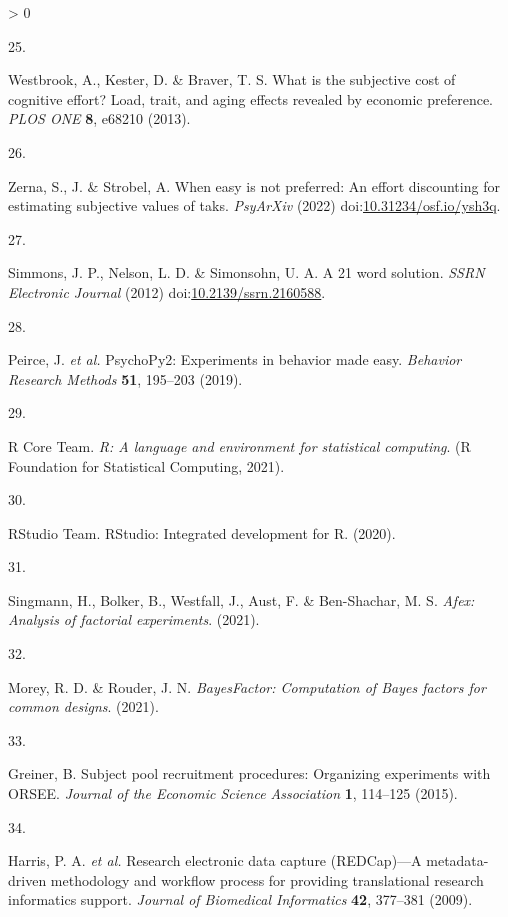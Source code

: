 \documentclass[
  english,
  man,floatsintext]{apa6}
\newlength{\cslhangindent}
\newlength{\csllabelwidth}
\newenvironment{CSLReferences}[2] %
 {%
  \setlength{\parindent}{0pt}
  \ifodd #1 \everypar{\setlength{\hangindent}{\cslhangindent}}\ignorespaces\fi
  \ifnum #2 > 0
  \setlength{\parskip}{#2\baselineskip}
  \fi
 }%
 {}
\newcommand{\CSLLeftMargin}[1]{\parbox[t]{\csllabelwidth}{#1}}
\newcommand{\CSLRightInline}[1]{\parbox[t]{\linewidth - \csllabelwidth}{#1}\break}
\begin{document}
\begin{CSLReferences}{0}{0}
\leavevmode\hypertarget{ref-Westbrook2013}{}%
\CSLLeftMargin{25. }
\CSLRightInline{Westbrook, A., Kester, D. \& Braver, T. S. What is the subjective cost of cognitive effort? {Load}, trait, and aging effects revealed by economic preference. \emph{PLOS ONE} \textbf{8}, e68210 (2013).}

\leavevmode\hypertarget{ref-Zerna2022}{}%
\CSLLeftMargin{26. }
\CSLRightInline{Zerna, S., J. \& Strobel, A. When easy is not preferred: An effort discounting for estimating subjective values of taks. \emph{PsyArXiv} (2022) doi:\href{https://doi.org/10.31234/osf.io/ysh3q}{10.31234/osf.io/ysh3q}.}

\leavevmode\hypertarget{ref-Simmons2012}{}%
\CSLLeftMargin{27. }
\CSLRightInline{Simmons, J. P., Nelson, L. D. \& Simonsohn, U. A. A 21 word solution. \emph{SSRN Electronic Journal} (2012) doi:\href{https://doi.org/10.2139/ssrn.2160588}{10.2139/ssrn.2160588}.}

\leavevmode\hypertarget{ref-Peirce2019}{}%
\CSLLeftMargin{28. }
\CSLRightInline{Peirce, J. \emph{et al.} {PsychoPy2}: {Experiments} in behavior made easy. \emph{Behavior Research Methods} \textbf{51}, 195--203 (2019).}

\leavevmode\hypertarget{ref-RCore2021}{}%
\CSLLeftMargin{29. }
\CSLRightInline{R Core Team. \emph{R: A language and environment for statistical computing}. (R Foundation for Statistical Computing, 2021).}

\leavevmode\hypertarget{ref-RStudioTeam2020}{}%
\CSLLeftMargin{30. }
\CSLRightInline{RStudio Team. {RStudio}: {Integrated} development for {R}. (2020).}

\leavevmode\hypertarget{ref-Singmann2021}{}%
\CSLLeftMargin{31. }
\CSLRightInline{Singmann, H., Bolker, B., Westfall, J., Aust, F. \& Ben-Shachar, M. S. \emph{Afex: {A}nalysis of factorial experiments}. (2021).}

\leavevmode\hypertarget{ref-Morey2021}{}%
\CSLLeftMargin{32. }
\CSLRightInline{Morey, R. D. \& Rouder, J. N. \emph{{BayesFactor}: {Computation} of {Bayes} factors for common designs}. (2021).}

\leavevmode\hypertarget{ref-Greiner2015}{}%
\CSLLeftMargin{33. }
\CSLRightInline{Greiner, B. Subject pool recruitment procedures: {Organizing} experiments with {ORSEE}. \emph{Journal of the Economic Science Association} \textbf{1}, 114--125 (2015).}

\leavevmode\hypertarget{ref-Harris2009}{}%
\CSLLeftMargin{34. }
\CSLRightInline{Harris, P. A. \emph{et al.} Research electronic data capture ({REDCap})---{A} metadata-driven methodology and workflow process for providing translational research informatics support. \emph{Journal of Biomedical Informatics} \textbf{42}, 377--381 (2009).}


\end{CSLReferences}
\end{document}
